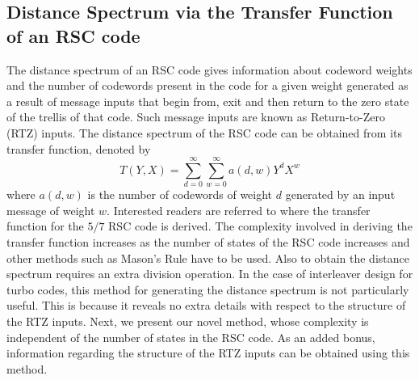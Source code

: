 \subsection{Distance Spectrum via the Transfer Function of an RSC code}
The distance spectrum of an RSC code gives information about codeword weights and the number of codewords present in the code for a given weight generated as a result of message inputs that begin from, exit and then return to the zero state of the trellis of that code. Such message inputs are known as Return-to-Zero (RTZ) inputs. The distance spectrum of the RSC code can be obtained from its transfer function, denoted by $$T(Y,X)=\sum_{d=0}^{\infty}\sum_{w=0}^{\infty} a(d,w)Y^dX^w$$ where $a(d,w)$ is the number of codewords of weight $d$ generated by an input message of weight $w$.
Interested readers are referred to \cite{ref3} where the transfer function for the $5/7$ RSC code is derived.
The complexity involved in deriving the transfer function increases as the number of states of the RSC code increases and other methods such as Mason's Rule \cite{ref3} have to be used. Also to obtain the distance spectrum requires an extra division operation. In the case of interleaver design for turbo codes, this method for generating the distance spectrum is not particularly useful. This is because it reveals no extra details with respect to the structure of the RTZ inputs. 
Next, we present our novel method, whose complexity is independent of the number of states in the RSC code. As an added bonus, information regarding the structure of the RTZ inputs can be obtained using this method.
